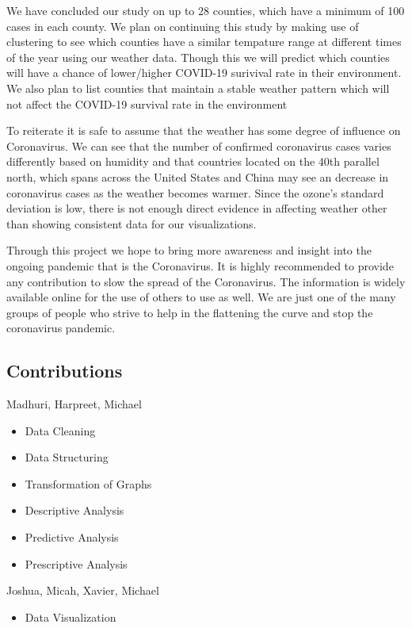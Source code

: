 \documentclass[10pt,journal,compsoc]{IEEEtran}
\begin{document}
{{{	We have concluded our study on up to 28 counties, which have a minimum of 100 cases in each county. We plan on continuing this study by making use of clustering to see which counties have a similar tempature range at different times of the year using our weather data. Though this we will predict which counties will have a chance of lower/higher COVID-19 surivival rate in their environment. We also plan to list counties that maintain a stable weather pattern which will not affect the COVID-19 survival rate in the environment

	To reiterate it is safe to assume that the weather has some degree of influence on Coronavirus. We can see that the number of confirmed coronavirus cases varies differently based on humidity and that countries located on the 40th parallel north, which spans across the United States and China may see an decrease in coronavirus cases as the weather becomes warmer. Since the ozone’s standard deviation is low, there is not enough direct evidence in affecting weather other than showing consistent data for our visualizations.

	Through this project we hope to bring more awareness and insight into the ongoing pandemic that is the Coronavirus. It is highly recommended to provide any contribution to slow the spread of the Coronavirus. The information is widely available online for the use of others to use as well. We are just one of the many groups of people who strive to help in the flattening the curve and stop the coronavirus pandemic.
\subsection{Contributions}
\label{subsec:Contributions}
Madhuri, Harpreet, Michael 
\begin{itemize}
	\item Data Cleaning  
	
	\item Data Structuring

	\item Transformation of Graphs

	\item Descriptive Analysis

	\item Predictive Analysis

	\item Prescriptive Analysis
\end{itemize}
Joshua, Micah, Xavier, Michael
\begin{itemize}
	\item Data Visualization
	

\end{itemize}}}}
\end{document}
